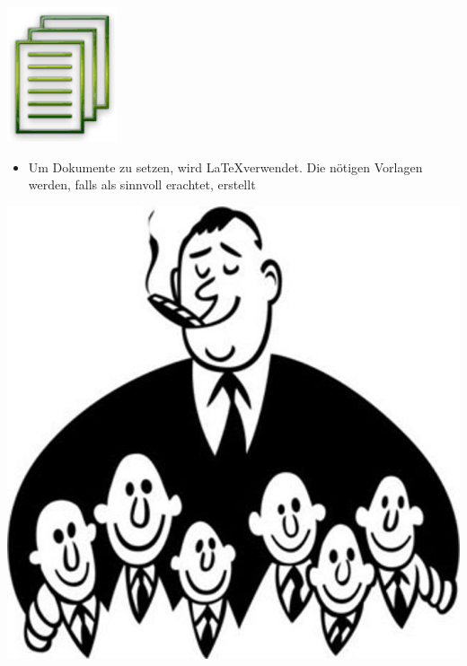 \begin{center}
\includegraphics[scale=1.2]{img/doc}\\
\end{center}

\begin{itemize}
\item Um Dokumente zu setzen, wird \LaTeX verwendet. Die nötigen Vorlagen werden, falls als sinnvoll erachtet, erstellt
\end{itemize}

\begin{center}
\includegraphics[scale=0.12]{img/boss}\\
\end{center}

